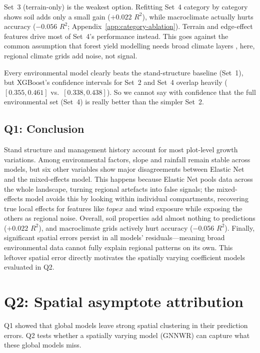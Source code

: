 \documentclass[logo,msc,ai]{infthesis}           %
\begin{document}
Set~3 (terrain-only) is the weakest option. Refitting Set~4 category by category shows soil adds only a small gain ($+0.022$ $R^2$), while macroclimate actually hurts accuracy ($-0.056$ $R^2$; Appendix~\ref{app:category-ablation}). Terrain and edge-effect features drive most of Set~4's performance instead. This goes against the common assumption that forest yield modelling needs broad climate layers \cite{bontemps2014Predictive_C2_BG}, here, regional climate grids add noise, not signal.

Every environmental model clearly beats the stand-structure baseline (Set~1), but XGBoost's confidence intervals for Set~2 and Set~4 overlap heavily ($[0.355, 0.461]$ vs.\ $[0.338, 0.438]$). So we cannot say with confidence that the full environmental set (Set~4) is really better than the simpler Set~2.



\subsection*{Q1: Conclusion}
Stand structure and management history account for most plot-level growth variations. Among environmental factors, slope and rainfall remain stable across models, but six other variables show major disagreements between Elastic Net and the mixed-effects model. This happens because Elastic Net pools data across the whole landscape, turning regional artefacts into false signals; the mixed-effects model avoids this by looking within individual compartments, recovering true local effects for features like $\mathit{topex}$ and wind exposure while exposing the others as regional noise. Overall, soil properties add almost nothing to predictions ($+0.022$ $R^2$), and macroclimate grids actively hurt accuracy ($-0.056$ $R^2$). Finally, significant spatial errors persist in all models' residuals—meaning broad environmental data cannot fully explain regional patterns on its own. This leftover spatial error directly motivates the spatially varying coefficient models evaluated in Q2.

\section{Q2: Spatial asymptote attribution}
Q1 showed that global models leave strong spatial clustering in their prediction errors. Q2 tests whether a spatially varying model (GNNWR) can capture what these global models miss.
\end{document}
